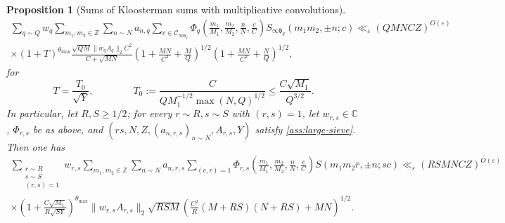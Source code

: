 \documentclass[reqno,11pt]{amsart}
\newtheorem{proposition}[theorem]{Proposition}
\theoremstyle{remark}
\numberwithin{equation}{section}
\newcommand{\Z}{\mathbb{Z}}
\newcommand{\C}{\mathbb{C}}
\newcommand{\mC}{\mathcal{C}}
\newcommand{\mb}{\mathfrak{b}}
\newcommand{\eps}{\varepsilon}
\renewcommand{\bar}{\overline}
\begin{document}
\begin{proposition}[Sums of Kloosterman sums with multiplicative convolutions]
\begin{equation} \label{eq:kloosterman-qm12nc}
\begin{aligned}
    \sum_{q \sim Q} w_q
    \sum_{m_1, m_2 \in \Z}
    \sum_{n \sim N} a_{n,q}
    \sum_{c \in \mC_{\infty\mb_q}} \Phi_q\left(\frac{m_1}{M_1}, \frac{m_2}{M_2}, \frac{n}{N}, \frac{c}{C}\right) S_{\infty\mb_q}(m_1 m_2, \pm n; c)
    \ll_\eps
    (QMNCZ)^{O(\eps)}
    \\
    \times 
    \left(1 + T\right)^{\theta_{\max}}
    \frac{\sqrt{QM} \|w_q A_q\|_2 C^2}{C + \sqrt{MN}} 
    \left(1 + \frac{MN}{C^2} + \frac{M}{Q} \right)^{1/2}
    \left(1 + \frac{MN}{C^2} + \frac{N}{Q}\right)^{1/2},
\end{aligned}
\end{equation}
for
\[
    T = \frac{T_0}{\sqrt{Y}}, 
    \qquad\qquad 
    T_0 := \frac{C}{QM_1^{-1/2} \max\left(N, Q\right)^{1/2}}
    \le
    \frac{C \sqrt{M_1}}{Q^{3/2}}.
\]
In particular, let $R, S \ge 1/2$; for every $r \sim R, s \sim S$ with $(r, s) = 1$, let $w_{r,s} \in \C$, $\Phi_{r,s}$ be as above, and $(rs, N, Z, (a_{n,r,s})_{n \sim N}, A_{r,s}, Y)$ satisfy \cref{ass:large-sieve}. Then one has 
\begin{equation} \label{eq:kloosterman-rsm12nc}
\begin{aligned}
    \sum_{\substack{r \sim R \\ s \sim S \\ (r, s) = 1}} w_{r,s} \sum_{m_1, m_2 \in \Z} 
    \sum_{n \sim N} a_{n,r,s}
    \sum_{(c, r) = 1} \Phi_{r,s}\left(\frac{m_1}{M_1}, \frac{m_2}{M_2}, \frac{n}{N}, \frac{c}{C}\right) S(m_1m_2\bar{r}, \pm n; sc)
    \ll_\eps
    (RSMNCZ)^{O(\eps)}
    \\
    \times 
    \left(1 + \frac{C \sqrt{M_1}}{R \sqrt{SY}}\right)^{\theta_{\max}} 
    \|w_{r,s} A_{r,s}\|_2 \sqrt{RSM}
    \left(\frac{C^2}{R} (M + RS)(N + RS) + MN \right)^{1/2}.
\end{aligned}
\end{equation}
\fi
\end{proposition}
\end{document}
